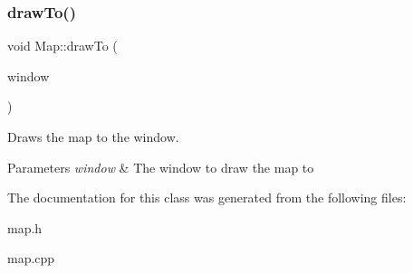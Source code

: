 \subsubsection{\texorpdfstring{drawTo()}{drawTo()}}
{\footnotesize\ttfamily void Map\+::draw\+To (\begin{DoxyParamCaption}\item[{sf\+::\+Render\+Window \&}]{window }\end{DoxyParamCaption})\hspace{0.3cm}{\ttfamily [virtual]}}



Draws the map to the window. 


\begin{DoxyParams}{Parameters}
{\em window} & The window to draw the map to \\
\hline
\end{DoxyParams}


The documentation for this class was generated from the following files\+:\begin{DoxyCompactItemize}
\item 
map.\+h\item 
map.\+cpp\end{DoxyCompactItemize}
